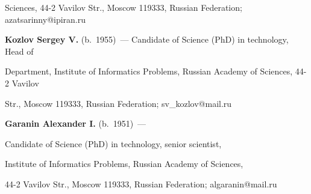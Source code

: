 Sciences, 44-2 Vavilov Str., Moscow 119333, Russian Federation; azatsarinny@ipiran.ru



\vspace*{3pt}



\noindent

\textbf{Kozlov Sergey V.} (b.\ 1955)~--- Candidate of Science (PhD) in technology, Head of

Department, Institute of Informatics Problems, Russian Academy of Sciences,  44-2 Vavilov

Str., Moscow 119333, Russian Federation; sv\_kozlov@mail.ru



\vspace*{3pt}





\noindent

\textbf{Garanin Alexander I.} (b.\ 1951)~---

Candidate of Science (PhD) in technology, senior scientist,

Institute of Informatics Problems, Russian Academy of Sciences,

44-2 Vavilov Str., Moscow 119333, Russian Federation; algaranin@mail.ru



 \label{end\stat}



\renewcommand{\bibname}{\protect\rm Литература}



